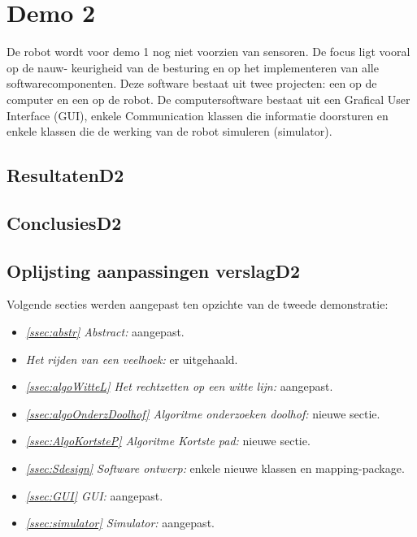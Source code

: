 \documentclass[tt3]{penoverslag}
\begin{document}
\section{Demo 2} %
\label{Asec:demo2}
De robot wordt voor demo 1 nog niet voorzien van sensoren. De focus ligt vooral op de nauw-
keurigheid van de besturing en op het implementeren van alle softwarecomponenten. Deze software
bestaat uit twee projecten: een op de computer en een op de robot. De computersoftware bestaat
uit een Grafical User Interface (GUI), enkele Communication klassen die informatie doorsturen en
enkele klassen die de werking van de robot simuleren (simulator).

\subsection{ResultatenD2} %
\label{Assec:result2}


\subsection{ConclusiesD2} %
\label{Assec:conc2}


\subsection{Oplijsting aanpassingen verslagD2} %
\label{Assec:aanp2}
Volgende secties werden aangepast ten opzichte van de tweede demonstratie:

\begin{itemize}

\item \textit{\ref{ssec:abstr} Abstract:} aangepast.
\item \textit{ Het rijden van een veelhoek:} er uitgehaald.
\item \textit{\ref{ssec:algoWitteL} Het rechtzetten op een witte lijn:} aangepast.
\item \textit{\ref{ssec:algoOnderzDoolhof} Algoritme onderzoeken doolhof:} nieuwe sectie.
\item \textit{\ref{ssec:AlgoKortsteP} Algoritme Kortste pad:} nieuwe sectie.
\item \textit{\ref{ssec:Sdesign} Software ontwerp:} enkele nieuwe klassen en mapping-package.
\item \textit{\ref{ssec:GUI} GUI:} aangepast.
\item \textit{\ref{ssec:simulator} Simulator:} aangepast.
\end{itemize}


\newpage


\end{document}

